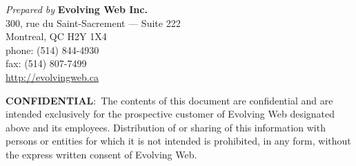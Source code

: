 \begin{titlingpage}
  \maketitle
  \vfill
\end{titlingpage}

\pagebreak

\thispagestyle{empty}

\emph{Prepared by} \textbf{Evolving Web Inc.} \\
300, rue du Saint-Sacrement --- Suite 222 \\
Montreal, QC H2Y 1X4 \\
phone: (514) 844-4930 \\
fax: (514) 807-7499 \\
\href{http://evolvingweb.ca}{http://evolvingweb.ca}

\vfill
\textbf{CONFIDENTIAL}:~The contents of this document are confidential
and are intended exclusively for the prospective customer of Evolving
Web designated above and its employees. Distribution of or sharing of
this information with persons or entities for which it is not intended
is prohibited, in any form, without the express written consent of
Evolving Web.
\pagebreak
